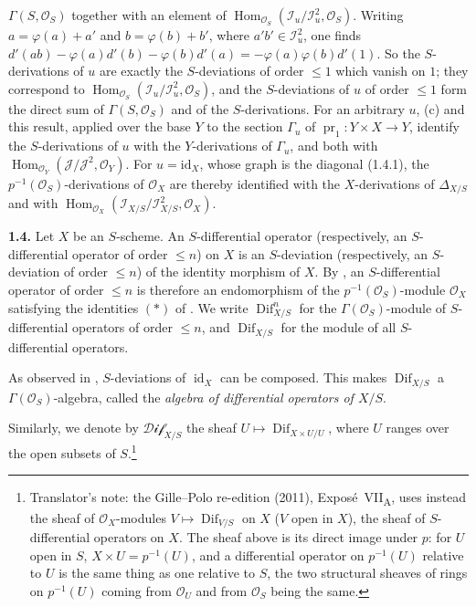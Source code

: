 \(\Gamma(S,\mathcal O_S)\) together with an element of
\(\operatorname{Hom}_{\mathcal O_S}(\mathcal I_u/\mathcal I_u^2,
\mathcal O_S)\). Writing \(a=\varphi(a)+a'\) and \(b=\varphi(b)+b'\),
where \(a'b'\in\mathcal I_u^2\), one finds
\(d'(ab)-\varphi(a)d'(b)-\varphi(b)d'(a)=-\varphi(a)\varphi(b)d'(1)\).
So the \(S\)-derivations of \(u\) are exactly the \(S\)-deviations of
order \(\leq1\) which vanish on \(1\); they correspond to
\(\operatorname{Hom}_{\mathcal O_S}(\mathcal I_u/\mathcal I_u^2,
\mathcal O_S)\), and the \(S\)-deviations of \(u\) of order \(\leq1\)
form the direct sum of \(\Gamma(S,\mathcal O_S)\) and of the
\(S\)-derivations. For an arbitrary \(u\), (c) and this result, applied
over the base \(Y\) to the section \(\Gamma_u\) of
\(\operatorname{pr}_1:Y\times X\to Y\), identify the \(S\)-derivations
of \(u\) with the \(Y\)-derivations of \(\Gamma_u\), and both with
\(\operatorname{Hom}_{\mathcal O_Y}(\mathcal J/\mathcal J^2,\mathcal O_Y)\).
For \(u=\mathrm{id}_X\), whose graph is the diagonal (1.4.1), the
\(p^{-1}(\mathcal O_S)\)-derivations of \(\mathcal O_X\) are thereby
identified with the \(X\)-derivations of \(\Delta_{X/S}\) and with
\(\operatorname{Hom}_{\mathcal O_X}(\mathcal I_{X/S}/\mathcal I_{X/S}^2,
\mathcal O_X)\).

\medskip
\noindent\textbf{1.4.}
\label{sga3:VIIA:1.4}
Let \(X\) be an \(S\)-scheme. An \(S\)-differential operator
(respectively, an \(S\)-differential operator of order \(\leq n\)) on
\(X\) is an \(S\)-deviation (respectively, an \(S\)-deviation of order
\(\leq n\)) of the identity morphism of \(X\). By , an \(S\)-differential operator of order \(\leq n\) is therefore
an endomorphism of the \(p^{-1}(\mathcal O_S)\)-module
\(\mathcal O_X\) satisfying the identities \((\ast)\) of . We
write \(\operatorname{Dif}^n_{X/S}\) for the
\(\Gamma(\mathcal O_S)\)-module
of \(S\)-differential operators of order \(\leq n\), and
\(\operatorname{Dif}_{X/S}\) for the module of all
\(S\)-differential operators.

As observed in , \(S\)-deviations of \(\operatorname{id}_X\) can be
composed. This makes \(\operatorname{Dif}_{X/S}\) a
\(\Gamma(\mathcal O_S)\)-algebra, called the \emph{algebra of
differential operators of \(X/S\)}.

Similarly, we denote by \(\mathcal{Dif}_{X/S}\) the sheaf
\(U\mapsto\operatorname{Dif}_{X\times U/U}\), where \(U\) ranges over the
open subsets of \(S\).\footnote{Translator's note: the Gille--Polo
re-edition (2011), Expos\'e~VII\textsubscript{A}, uses instead the sheaf
of \(\mathcal O_X\)-modules \(V\mapsto\operatorname{Dif}_{V/S}\) on \(X\)
(\(V\) open in \(X\)), the sheaf of \(S\)-differential operators on
\(X\). The sheaf above is its direct image under \(p\): for \(U\) open in
\(S\), \(X\times U=p^{-1}(U)\), and a differential operator on
\(p^{-1}(U)\) relative to \(U\) is the same thing as one relative to
\(S\), the two structural sheaves of rings on \(p^{-1}(U)\) coming from
\(\mathcal O_U\) and from \(\mathcal O_S\) being the same.}

